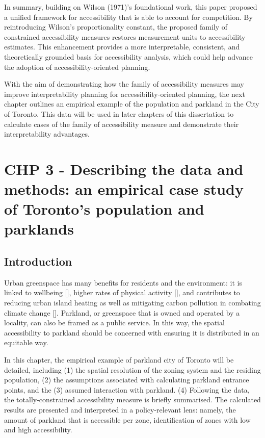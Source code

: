 \documentclass[
11pt, %
oneside, %
english, %
singlespacing, %
]{macthesis} %
\begin{document}
In summary, building on Wilson (1971)'s foundational work, this paper proposed a unified framework for accessibility that is able to account for competition. By reintroducing Wilson's proportionality constant, the proposed family of constrained accessibility measures restores measurement units to accessibility estimates. This enhancement provides a more interpretable, consistent, and theoretically grounded basis for accessibility analysis, which could help advance the adoption of accessibility-oriented planning.

With the aim of demonstrating how the family of accessibility measures may improve interpretability planning for accessibility-oriented planning, the next chapter outlines an empirical example of the population and parkland in the City of Toronto. This data will be used in later chapters of this dissertation to calculate cases of the family of accessibility measure and demonstrate their interpretability advantages.

\chapter{CHP 3 - Describing the data and methods: an empirical case study of Toronto's population and parklands}\label{chp-3---describing-the-data-and-methods-an-empirical-case-study-of-torontos-population-and-parklands}

\section{Introduction}\label{introduction-1}

Urban greenspace has many benefits for residents and the environment: it is linked to wellbeing {[}{]}, higher rates of physical activity {[}{]}, and contributes to reducing urban island heating as well as mitigating carbon pollution in combating climate change {[}{]}. Parkland, or greenspace that is owned and operated by a locality, can also be framed as a public service. In this way, the spatial accessibility to parkland should be concerned with ensuring it is distributed in an equitable way.

In this chapter, the empirical example of parkland city of Toronto will be detailed, including (1) the spatial resolution of the zoning system and the residing population, (2) the assumptions associated with calculating parkland entrance points, and the (3) assumed interaction with parkland. (4) Following the data, the totally-constrained accessibility measure is briefly summarised. The calculated results are presented and interpreted in a policy-relevant lens: namely, the amount of parkland that is accessible per zone, identification of zones with low and high accessibility.
\end{document}
